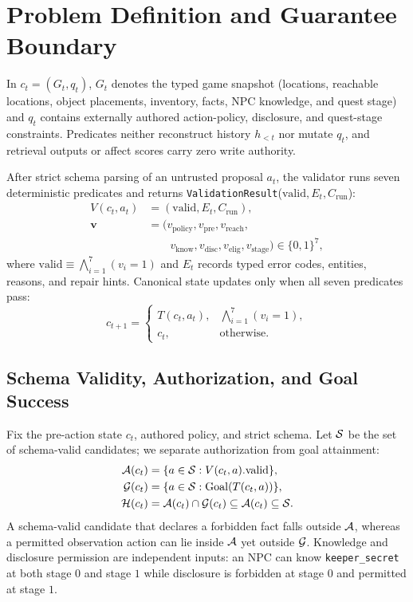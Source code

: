 \section{Problem Definition and Guarantee Boundary}\label{sec:problem}
In $c_t=(G_t,q_t)$, $G_t$ denotes the typed game snapshot (locations, reachable locations, object placements, inventory, facts, NPC knowledge, and quest stage) and $q_t$ contains externally authored action-policy, disclosure, and quest-stage constraints. Predicates neither reconstruct history $h_{<t}$ nor mutate $q_t$, and retrieval outputs or affect scores carry zero write authority.

After strict schema parsing of an untrusted proposal $a_t$, the validator runs seven deterministic predicates and returns \texttt{Validation}\allowbreak\texttt{Result}(\allowbreak$\mathrm{valid},E_t,C_{\mathrm{run}}$):
\begin{equation}
\begin{aligned}
V(c_t,a_t)&=(\mathrm{valid},E_t,C_{\mathrm{run}}),\\
\boldsymbol{v}&=(v_{\mathrm{policy}},v_{\mathrm{pre}},v_{\mathrm{reach}},\\
&\qquad v_{\mathrm{know}},v_{\mathrm{disc}},v_{\mathrm{elig}},v_{\mathrm{stage}})\in\{0,1\}^{7},
\end{aligned}
\end{equation}
where $\mathrm{valid}\equiv\bigwedge_{i=1}^{7}(v_i=1)$ and $E_t$ records typed error codes, entities, reasons, and repair hints. Canonical state updates only when all seven predicates pass:
\begin{equation}
c_{t+1}=\begin{cases}
T(c_t,a_t), & \bigwedge_{i=1}^{7}(v_i=1),\\
c_t, & \text{otherwise.}
\end{cases}
\label{eq:transition}
\end{equation}

\subsection{Schema Validity, Authorization, and Goal Success}\label{sec:authorization-sets}
Fix the pre-action state $c_t$, authored policy, and strict schema. Let $\mathcal{S}$ be the set of schema-valid candidates; we separate authorization from goal attainment:
\begin{equation}
\begin{aligned}
\mathcal{A}(c_t)&=\{a\in\mathcal{S}:V(c_t,a).\mathrm{valid}\},\\
\mathcal{G}(c_t)&=\{a\in\mathcal{S}:\operatorname{Goal}(T(c_t,a))\},\\
\mathcal{H}(c_t)&=\mathcal{A}(c_t)\cap\mathcal{G}(c_t)\subseteq\mathcal{A}(c_t)\subseteq\mathcal{S}.
\end{aligned}
\end{equation}
A schema-valid candidate that declares a forbidden fact falls outside $\mathcal{A}$, whereas a permitted observation action can lie inside $\mathcal{A}$ yet outside $\mathcal{G}$. Knowledge and disclosure permission are independent inputs: an NPC can know \texttt{keeper\_\allowbreak secret} at both stage $0$ and stage $1$ while disclosure is forbidden at stage $0$ and permitted at stage $1$.

